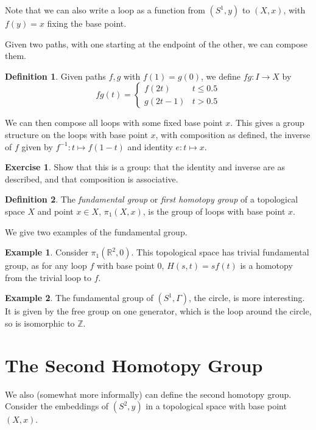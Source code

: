 \documentclass[a4paper,12pt]{article}
\newcommand{\ZZ}{\mathbb{Z}}
\newcommand{\RR}{\mathbb{R}}
\newcommand{\ZZ}{\mathbb{Z}}
\newcommand{\RR}{\mathbb{R}}
\theoremstyle{definition}
\newtheorem*{defn}{Definition}
\newtheorem*{exer}{Exercise}
\newtheorem*{example}{Example}
\begin{document}
Note that we can also write a loop as a function from $(S^1, y)$ to $(X, x)$, with $f(y) = x$ fixing the base point.

Given two paths, with one starting at the endpoint of the other, we can compose them.

\begin{defn}
Given paths $f, g$ with $f(1) = g(0)$, we define $fg: I\to X$ by
$$fg(t) = \begin{cases}f(2t) & t\leq 0.5\\ g(2t-1) & t > 0.5\end{cases}$$
\end{defn}

We can then compose all loops with some fixed base point $x$.
This gives a group structure on the loops with base point $x$, with composition as defined, the inverse of $f$ given by $f^{-1}: t\mapsto f(1-t)$ and identity $e: t\mapsto x$.

\begin{exer}
Show that this is a group: that the identity and inverse are as described, and that composition is associative.
\end{exer}

\begin{defn}
The \emph{fundamental group} or \emph{first homotopy group} of a topological space $X$ and point $x\in X$, $\pi_1(X, x)$, is the group of loops with base point $x$.
\end{defn}

We give two examples of the fundamental group.

\begin{example}
Consider $\pi_1(\RR^2, 0)$.
This topological space has trivial fundamental group, as for any loop $f$ with base point 0, $H(s, t) = sf(t)$ is a homotopy from the trivial loop to $f$.
\end{example}

\begin{example}
The fundamental group of $(S^1, \Gamma)$, the circle, is more interesting.
It is given by the free group on one generator, which is the loop around the circle, so is isomorphic to $\ZZ$.
\end{example}

\section{The Second Homotopy Group}

We also (somewhat more informally) can define the second homotopy group.
Consider the embeddings of $(S^2, y)$ in a topological space with base point $(X, x)$.
\end{document}
